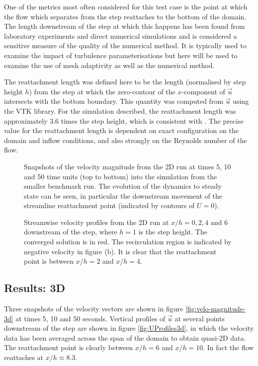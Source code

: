 One of the metrics most often considered for this test case is the point at which the
flow which separates from the step reattaches to the bottom of the domain.
The length downstream of the step at which this happens
has been found from laboratory experiments and direct numerical simulations and is considered a
sensitive measure of the quality of the numerical method. It is typically used to examine the impact
of turbulence parameterisations but here will be used to examine the use of mesh adaptivity
as well as the numerical method.

The reattachment length was defined here to be the length (normalised by step height $h$)
from the step at which the zero-contour of the $x$-component of $\vec{u}$ intersects with
the bottom boundary. This quantity was computed from $\vec{u}$
using the VTK library. For the simulation described, the reattachment
length was approximately 3.6 times the step height, which is consistent with \cite{armaly1983}.
The precise value for the reattachment length is dependent on exact configuration on the domain and inflow
conditions, and also strongly on the Reynolds number of the flow.

\begin{figure}
\centering
{}
\caption{Snapshots of the velocity magnitude from the 2D run at times 5, 10 and 50 time units
(top to bottom) into the simulation from the smaller benchmark run.
The evolution of the dynamics to steady state can be seen, in particular the downstream movement
of the streamline reattachment point (indicated by contours of $U=0$).}
\label{fig:velo-magnitude-2d}
\end{figure}

\begin{figure}
\centering
{}
\caption{Streamwise velocity profiles from the 2D run at $x/h=0, 2, 4 \text{ and } 6$
downstream of the step, where $h=1$ is the step height. The converged solution is in red.
The recirculation region is indicated by negative velocity in figure (b).
It is clear that the reattachment point is between $x/h=2$ and $x/h=4$.}
\label{fig:UProfiles2d}
\end{figure}


\subsection{Results: 3D}
Three snapshots of the velocity vectors are shown in figure \ref{fig:velo-magnitude-3d}
at times 5, 10 and 50 seconds.
Vertical profiles of $\vec{u}$ at several points downstream of the step are shown in figure
\ref{fig:UProfiles3d}, in which the velocity data has been averaged across the span of the domain
to obtain quasi-2D data. The reattachment point is clearly between $x/h=6$ and $x/h=10$.
In fact the flow reattaches at $x/h \approx 8.3$.


